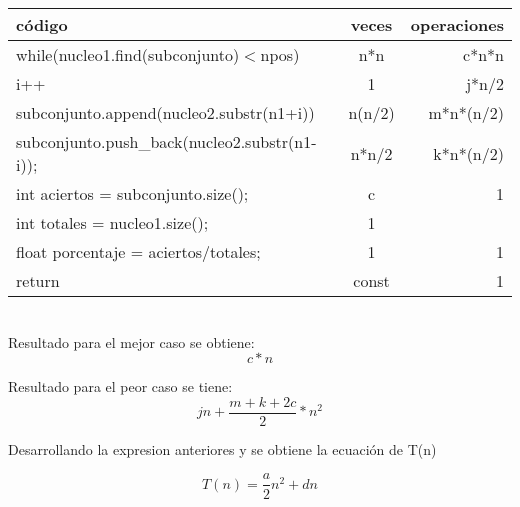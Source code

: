 \documentclass[10pt,a4paper,spanish] {article}
\begin{document}
\begin{tabular}{|l|c|r|}
\hline
código & veces & operaciones\\
\hline
while(nucleo1.find(subconjunto)$<$npos)\ & n*n & c*n*n \\
i++ & 1 & j*n/2 \\
subconjunto.append(nucleo2.substr(n1+i)) & n(n/2) & m*n*(n/2)\\
subconjunto.push\_back(nucleo2.substr(n1-i));& n*n/2 & k*n*(n/2)\\
int aciertos = subconjunto.size(); & c & 1 \\
int totales  = nucleo1.size(); & 1 & \\
float porcentaje = aciertos/totales;  & 1 & 1 \\
return & const & 1\\
\hline
\end{tabular}
\\
\newline
Resultado para el mejor caso se obtiene: \\

\begin{equation}
\label{eq:best}
c*n
\end{equation}


Resultado para el peor caso se tiene:\\

\begin{equation}
\label{eq:worst}
jn + \frac{m+k+2c}{2}*n^2
\end{equation}

Desarrollando la expresion anteriores y se obtiene la ecuación de T(n)

\begin{equation}
\label{eq:T(n)}
T(n)=\frac{a}{2}n^2 + dn 
\end{equation}
\end{document}
